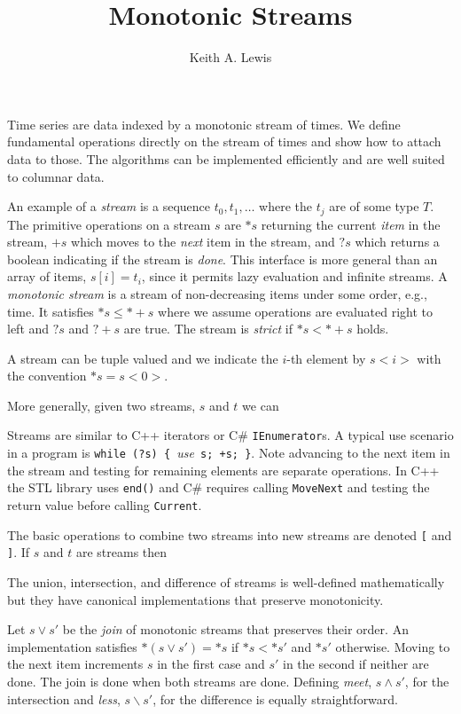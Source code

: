 \documentclass[12pt,letterpaper,fleqn]{report}
\author{Keith A. Lewis}
\title{Monotonic Streams}
\begin{document}
\maketitle
Time series are data indexed by a monotonic stream of times.
We define fundamental operations
directly on the stream of times and show how to attach data to
those. The algorithms can be implemented efficiently and are well
suited to columnar data.

An example of a {\em stream} is a sequence \(t_0, t_1, \dots\) where the
\(t_j\) are of some type \(T\).  The primitive operations on a stream
\(s\) are \(*s\) returning the current {\em item} in the stream, \(+s\)
which moves to the {\em next} item in the stream, and \(?s\) which returns
a boolean indicating if the stream is {\em done}. This interface is more
general than an array of items, \(s[i] = t_i\), since it permits lazy
evaluation and infinite streams. A {\em monotonic stream} is a stream of
non-decreasing items under some order, e.g., time. It satisfies \(*s \le
*+s\) where we assume operations are evaluated right to left and \(?s\)
and \(?+s\) are true. The stream is {\em strict} if \(*s < *+s\) holds.

A stream can be tuple valued and we indicate the $i$-th element
by $s<i>$ with the convention $*s = s<0>$. 

More generally, given two streams, $s$ and $t$ we can

Streams are similar to C++ iterators or C\# {\tt IEnumerator}s.
A typical use scenario in a program is {\tt while (?s) \{ }{\em use\
}{\tt *s; +s; \}}.  Note advancing to the next item in the stream and
testing for remaining elements are separate operations.  In C++ the
STL library uses {\tt end()} and C\# requires calling {\tt MoveNext}
and testing the return value before calling {\tt Current}.

The basic operations to combine two streams into new streams 
are denoted {\tt [} and {\tt ]}. If $s$ and $t$ are streams
then

The union, intersection, and difference of streams is well-defined
mathematically but they have canonical implementations
that preserve monotonicity.

Let \(s\vee s'\) be the {\em join} of monotonic streams that preserves
their order.  An implementation satisfies \(*(s\vee s') = *s\) if \(*s <
*s'\) and \(*s'\) otherwise.  Moving to the next item increments \(s\)
in the first case and \(s'\) in the second if neither are done. The
join is done when both streams are done. Defining {\em meet}, \(s\wedge
s'\), for the intersection and {\em less}, \(s\backslash s'\), for the
difference is equally straightforward.
\end{document}
